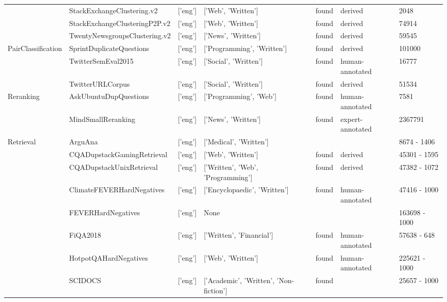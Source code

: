\begin{table*}
{\begin{tabular}{lllllll}
 & StackExchangeClustering.v2 \cite{geigle:2021:arxiv} & ['eng'] & ['Web', 'Written'] & found & derived & 2048 \\
 & StackExchangeClusteringP2P.v2 \cite{geigle:2021:arxiv} & ['eng'] & ['Web', 'Written'] & found & derived & 74914 \\
 & TwentyNewsgroupsClustering.v2 \cite{LANG1995331} & ['eng'] & ['News', 'Written'] & found & derived & 59545 \\
\cline{1-7}
\multirow[t]{3}{*}{PairClassification} & SprintDuplicateQuestions \cite{shah-etal-2018-adversarial} & ['eng'] & ['Programming', 'Written'] & found & derived & 101000 \\
 & TwitterSemEval2015 \cite{xu-etal-2015-semeval} & ['eng'] & ['Social', 'Written'] & found & human-annotated & 16777 \\
 & TwitterURLCorpus \cite{lan-etal-2017-continuously} & ['eng'] & ['Social', 'Written'] & found & derived & 51534 \\
\cline{1-7}
\multirow[t]{2}{*}{Reranking} & AskUbuntuDupQuestions \cite{wang-2021-TSDAE} & ['eng'] & ['Programming', 'Web'] & found & human-annotated & 7581 \\
 & MindSmallReranking \cite{wu-etal-2020-mind} & ['eng'] & ['News', 'Written'] & found & expert-annotated & 2367791 \\
\cline{1-7}
\multirow[t]{10}{*}{Retrieval} & ArguAna \cite{boteva2016} & ['eng'] & ['Medical', 'Written'] & & & 8674 - 1406 \\
 & CQADupstackGamingRetrieval \cite{hoogeveen2015} & ['eng'] & ['Web', 'Written'] & found & derived & 45301 - 1595 \\
 & CQADupstackUnixRetrieval \cite{hoogeveen2015} & ['eng'] & ['Written', 'Web', 'Programming'] & found & derived & 47382 - 1072 \\
 & ClimateFEVERHardNegatives \cite{diggelmann2021climatefever} & ['eng'] & ['Encyclopaedic', 'Written'] & found & human-annotated & 47416 - 1000 \\
 & FEVERHardNegatives \cite{thorne-etal-2018-fever} & ['eng'] & None & & & 163698 - 1000 \\
 & FiQA2018 \cite{
thakur2021beir} & ['eng'] & ['Written', 'Financial'] & found & human-annotated & 57638 - 648 \\
 & HotpotQAHardNegatives \cite{yang-etal-2018-hotpotqa} & ['eng'] & ['Web', 'Written'] & found & human-annotated & 225621 - 1000 \\
 & SCIDOCS \cite{specter2020cohan} & ['eng'] & ['Academic', 'Written', 'Non-fiction'] & found & & 25657 - 1000 \\

\end{tabular}}
\end{table*}

